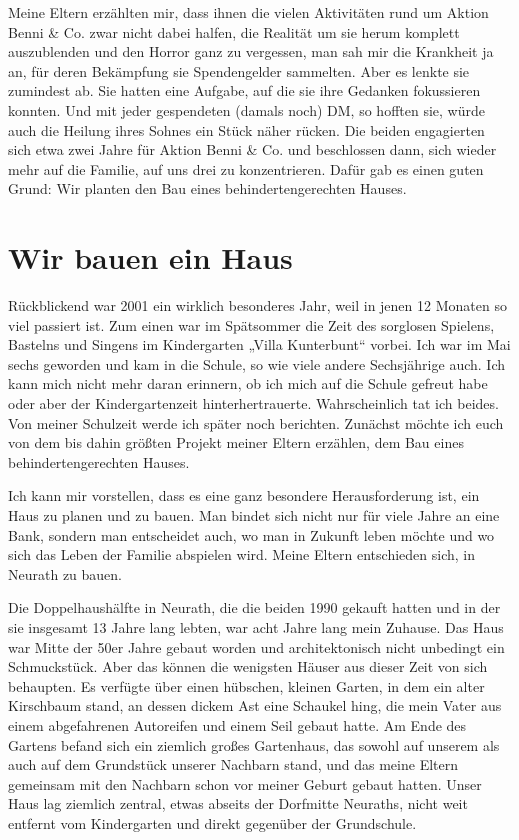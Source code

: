 \documentclass[fontsize=14pt,a4paper,headinclude,DIV=calc,automark]{scrbook}
\begin{document}
Meine Eltern erzählten mir, dass ihnen die vielen Aktivitäten rund um Aktion Benni \& Co. zwar nicht dabei halfen, die Realität um sie herum komplett auszublenden und den Horror ganz zu vergessen, man sah mir die Krankheit ja an, für deren Bekämpfung sie Spendengelder sammelten. Aber es lenkte sie zumindest ab. Sie hatten eine Aufgabe, auf die sie ihre Gedanken fokussieren konnten. Und mit jeder gespendeten (damals noch) DM, so hofften sie, würde auch die Heilung ihres Sohnes ein Stück näher rücken. Die beiden engagierten sich etwa zwei Jahre für Aktion Benni \& Co. und beschlossen dann, sich wieder mehr auf die Familie, auf uns drei zu konzentrieren. Dafür gab es einen guten Grund: Wir planten den Bau eines behindertengerechten Hauses.

\section{Wir bauen ein Haus}

Rückblickend war 2001 ein wirklich besonderes Jahr, weil in jenen 12 Monaten so viel passiert ist. Zum einen war im Spätsommer die Zeit des sorglosen Spielens, Bastelns und Singens im Kindergarten „Villa Kunterbunt“ vorbei. Ich war im Mai sechs geworden und kam in die Schule, so wie viele andere Sechsjährige auch. Ich kann mich nicht mehr daran erinnern, ob ich mich auf die Schule gefreut habe oder aber der Kindergartenzeit hinterhertrauerte. Wahrscheinlich tat ich beides. Von meiner Schulzeit werde ich später noch berichten. Zunächst möchte ich euch von dem bis dahin größten Projekt meiner Eltern erzählen, dem Bau eines behindertengerechten Hauses.

Ich kann mir vorstellen, dass es eine ganz besondere Herausforderung ist, ein Haus zu planen und zu bauen. Man bindet sich nicht nur für viele Jahre an eine Bank, sondern man entscheidet auch, wo man in Zukunft leben möchte und wo sich das Leben der Familie abspielen wird. Meine Eltern entschieden sich, in Neurath zu bauen.

Die Doppelhaushälfte in Neurath, die die beiden 1990 gekauft hatten und in der sie insgesamt 13 Jahre lang lebten, war acht Jahre lang mein Zuhause. Das Haus war Mitte der 50er Jahre gebaut worden und architektonisch nicht unbedingt ein Schmuckstück. Aber das können die wenigsten Häuser aus dieser Zeit von sich behaupten. Es verfügte über einen hübschen, kleinen Garten, in dem ein alter Kirschbaum stand, an dessen dickem Ast eine Schaukel hing, die mein Vater aus einem abgefahrenen Autoreifen und einem Seil gebaut hatte. Am Ende des Gartens befand sich ein ziemlich großes Gartenhaus, das sowohl auf unserem als auch auf dem Grundstück unserer Nachbarn stand, und das meine Eltern gemeinsam mit den Nachbarn schon vor meiner Geburt gebaut hatten. Unser Haus lag ziemlich zentral, etwas abseits der Dorfmitte Neuraths, nicht weit entfernt vom Kindergarten und direkt gegenüber der Grundschule.
\end{document}
